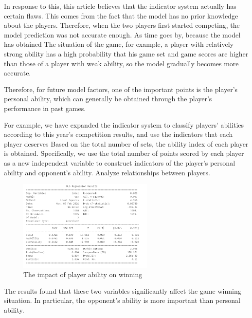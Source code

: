 \documentclass{article}
\begin{document}
In response to this, this article believes that the indicator system actually has certain flaws. This comes from the fact that the model has no prior knowledge about the players. Therefore, when the two players first started competing, the model prediction was not accurate enough. As time goes by, because the model has obtained The situation of the game, for example, a player with relatively strong ability has a high probability that his game set and game scores are higher than those of a player with weak ability, so the model gradually becomes more accurate.

Therefore, for future model factors, one of the important points is the player's personal ability, which can generally be obtained through the player's performance in past games.

For example, we have expanded the indicator system to classify players' abilities according to this year's competition results, and use the indicators that each player deserves
Based on the total number of sets, the ability index of each player is obtained. Specifically, we use the total number of points scored by each player as a new independent variable to construct indicators of the player's personal ability and opponent's ability. Analyze relationships between players.

\begin{figure}[H]
      \centering
      \includegraphics[width=0.6\textwidth]{logisticRegression2.png}
      \caption{The impact of player ability on winning}
\end{figure}

The results found that these two variables significantly affect the game winning situation. In particular, the opponent's ability is more important than personal ability.
\end{document}

